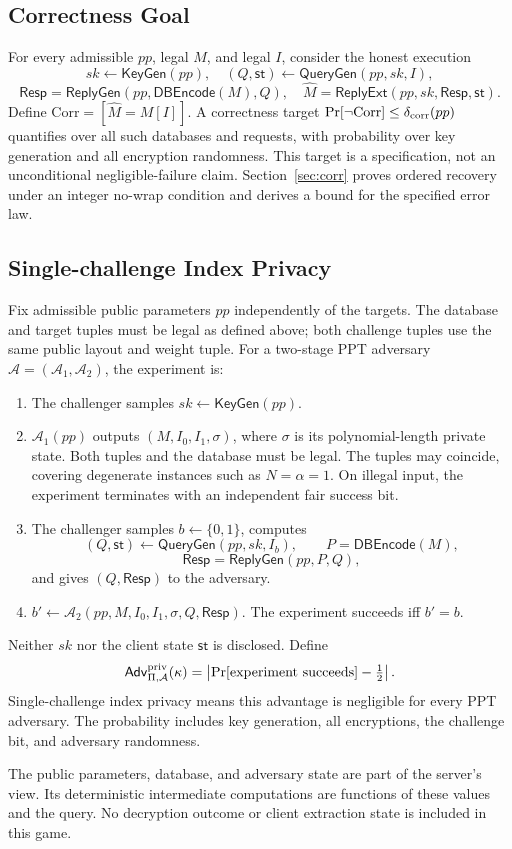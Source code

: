\subsection{Correctness Goal}
For every admissible \(pp\), legal \(M\), and legal \(I\), consider the
honest execution
\[
 sk\leftarrow\mathsf{KeyGen}(pp),\quad
 (Q,\mathsf{st})\leftarrow\mathsf{QueryGen}(pp,sk,I),
\]
\[
 \mathsf{Resp}=\mathsf{ReplyGen}(pp,\mathsf{DBEncode}(M),Q),\quad
 \widehat M=\mathsf{ReplyExt}(pp,sk,\mathsf{Resp},\mathsf{st}).
\]
Define \(\mathrm{Corr}=[\widehat M=M[I]]\). A correctness target
\(\Pr[\neg\mathrm{Corr}]\le\delta_{\rm corr}(pp)\) quantifies over all
such databases and requests, with probability over key generation and
all encryption randomness. This target is a specification, not an
unconditional negligible-failure claim. Section~\ref{sec:corr} proves
ordered recovery under an integer no-wrap condition and derives a bound
for the specified error law.

\subsection{Single-challenge Index Privacy}
\label{sec:mq-privacy}
\begin{definition}
\label{def:mq-cpir-privacy}
Fix admissible public parameters \(pp\) independently of the targets. The database and target tuples must be legal as defined above; both
challenge tuples use the same public layout and weight tuple. For a two-stage PPT adversary \(\mathcal A=(\mathcal A_1,\mathcal A_2)\),
the experiment is:
\begin{enumerate}
\item The challenger samples \(sk\leftarrow\mathsf{KeyGen}(pp)\).
\item \(\mathcal A_1(pp)\) outputs \((M,I_0,I_1,\sigma)\), where \(\sigma\)
is its polynomial-length private state. Both tuples and the database must be
legal. The tuples may coincide, covering degenerate instances such as
\(N=\alpha=1\). On illegal input, the experiment terminates with an independent
fair success bit.
\item The challenger samples \(b\leftarrow\{0,1\}\), computes
\[
 (Q,\mathsf{st})\leftarrow\mathsf{QueryGen}(pp,sk,I_b),\qquad
 P=\mathsf{DBEncode}(M),
\]
\[
 \mathsf{Resp}=\mathsf{ReplyGen}(pp,P,Q),
\]
and gives \((Q,\mathsf{Resp})\) to the adversary.
\item \(b'\leftarrow\mathcal A_2(pp,M,I_0,I_1,\sigma,Q,\mathsf{Resp})\).
The experiment succeeds iff \(b'=b\).
\end{enumerate}
Neither \(sk\) nor the client state \(\mathsf{st}\) is disclosed. Define
\[
 \mathsf{Adv}^{\rm priv}_{\Pi,\mathcal A}(\kappa)
   =\left|\Pr[\text{experiment succeeds}]-\tfrac12\right|.
\]
Single-challenge index privacy means this advantage is negligible for every
PPT adversary. The probability includes key generation, all encryptions,
the challenge bit, and adversary randomness.
\end{definition}
The public parameters, database, and adversary state are part of the server's
view. Its deterministic intermediate computations are functions of these
values and the query. No decryption outcome or client extraction state is
included in this game.

